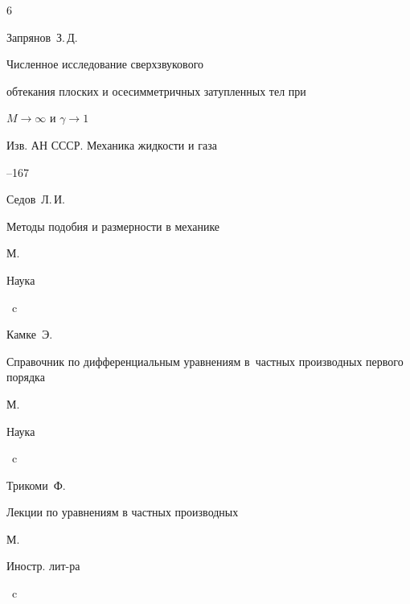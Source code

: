 \begin{thebibliography}{6}


\by Запрянов~З.\,Д.


\paper Численное исследование сверхзвукового


обтекания плоских и осесимметричных затупленных тел при


$M\to\infty$ и $\gamma\to 1$


\jour Изв. АН СССР. Механика жидкости и газа






--167







\by Седов~Л.\,И.


\book  Методы подобия и размерности в механике


\publaddr М.


\publ Наука




~c







\by Камке~Э.


\book  Справочник по дифференциальным уравнениям в~частных производных первого порядка


\publaddr М.


\publ Наука




~c







\by Трикоми~Ф.


\book Лекции по уравнениям в частных производных


\publaddr М.


\publ Иностр. лит-ра




~c


\end{thebibliography}
















\makeengtitlem








  \lfoot[\thepage]{}


  \rfoot[]{\thepage}


%




%




%


% 


